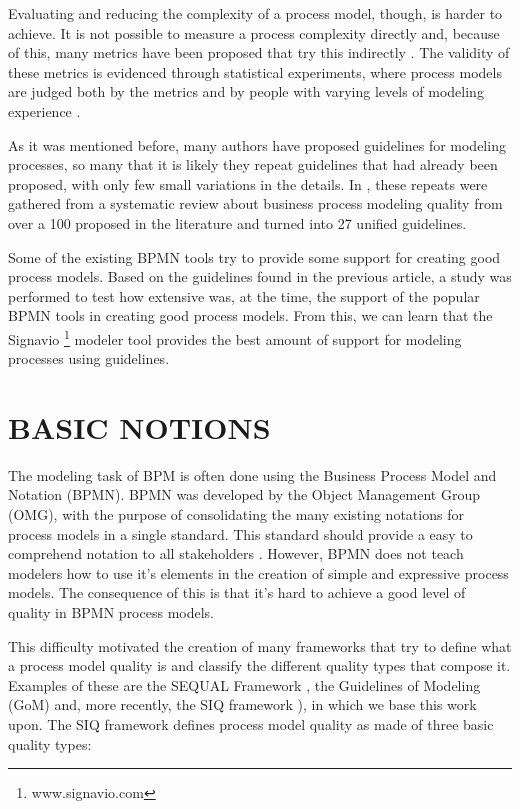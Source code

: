 \documentclass[a4paper,twoside]{article}
\begin{document}
Evaluating and reducing the complexity of a process model, though, is harder to achieve. It is not possible to measure a process complexity directly and, because of this, many metrics have been proposed that try this indirectly \cite{Vanderfeesten2007} \cite{Mendling2008b} \cite{Gruhn2006}. The validity of these metrics is evidenced through statistical experiments, where process models are judged both by the metrics and by people with varying levels of modeling experience \cite{Cardoso2006a} \cite{Sanchez-Gonzalez2008}.

As it was mentioned before, many authors have proposed guidelines for modeling processes, so many that it is likely they repeat guidelines that had already been proposed, with only few small variations in the details. In \cite{Moreno-MontesdeOca2014}, these repeats were gathered from a systematic review about business process modeling quality from over a 100 proposed in the literature and turned into 27 unified guidelines.  

Some of the existing BPMN tools try to provide some support for creating good process models. Based on the guidelines found in the previous article, a study \cite{MoniqueSnoeckIsel2015} was performed to test how extensive was, at the time, the support of the popular BPMN tools in creating good process models. From this, we can learn that the Signavio \footnote{www.signavio.com} modeler tool provides the best amount of support for modeling processes using guidelines. 


\section{BASIC NOTIONS}\label{Fundamentals}\label{Background}

\noindent The modeling task of BPM is often done using the Business Process Model and Notation (BPMN). BPMN was developed by the Object Management Group (OMG), with the purpose of consolidating the many existing notations for process models in a single standard. This standard should provide a easy to comprehend notation to all stakeholders \cite{OMGObjectManagementGroup2015}. However, BPMN does not teach modelers how to use it's elements in the creation of simple and expressive process models. The consequence of this is that it's hard to achieve a good level of quality in BPMN process models.


This difficulty motivated the creation of many frameworks that try to define what a process model quality is and classify the different quality types that compose it. Examples of these are the SEQUAL Framework \cite{krogstie2012}, the Guidelines of Modeling (GoM) \cite{Schuette1998} and, more recently, the SIQ framework \cite{Reijers2015}), in which we base this work upon. The SIQ framework defines process model quality as made of three basic quality types:
\end{document}
